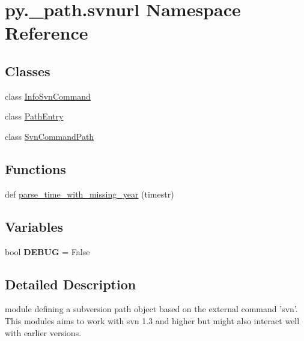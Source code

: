 \hypertarget{namespacepy_1_1__path_1_1svnurl}{}\section{py.\+\_\+path.\+svnurl Namespace Reference}
\label{namespacepy_1_1__path_1_1svnurl}
\subsection*{Classes}
\begin{DoxyCompactItemize}
\item 
class \hyperlink{classpy_1_1__path_1_1svnurl_1_1_info_svn_command}{Info\+Svn\+Command}
\item 
class \hyperlink{classpy_1_1__path_1_1svnurl_1_1_path_entry}{Path\+Entry}
\item 
class \hyperlink{classpy_1_1__path_1_1svnurl_1_1_svn_command_path}{Svn\+Command\+Path}
\end{DoxyCompactItemize}
\subsection*{Functions}
\begin{DoxyCompactItemize}
\item 
def \hyperlink{namespacepy_1_1__path_1_1svnurl_ad056bf2b52547d0adb336fe95e32f3fa}{parse\+\_\+time\+\_\+with\+\_\+missing\+\_\+year} (timestr)
\end{DoxyCompactItemize}
\subsection*{Variables}
\begin{DoxyCompactItemize}
\item 
\mbox{\label{namespacepy_1_1__path_1_1svnurl_a7c55a1eb25e62a669458a5d9dfe87e47}} 
bool {\bfseries D\+E\+B\+UG} = False
\end{DoxyCompactItemize}


\subsection{Detailed Description}
\begin{DoxyVerb}module defining a subversion path object based on the external
command 'svn'. This modules aims to work with svn 1.3 and higher
but might also interact well with earlier versions.
\end{DoxyVerb}
 

